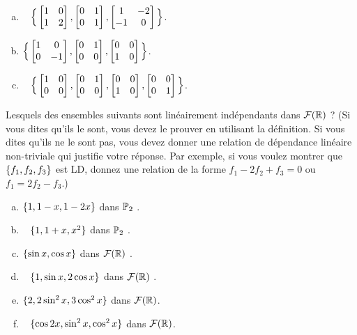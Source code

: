 \begin{prob}
\begin{enumerate}[a)]
\item\sov~ $\Big\{\bmatrix 1&0\\1&2\endbmatrix, \bmatrix 0&1\\0&1\endbmatrix , \bmatrix 1&-2\\-1&0\endbmatrix \Big\}$.   \medskip
 

\item  $\Big\{\bmatrix 1&0\\0&-1\endbmatrix, \bmatrix 0&1\\0&0\endbmatrix,\bmatrix 0&0\\1&0\endbmatrix\Big\}$.  \medskip
 
 \item\sov~ $\Big\{\bmatrix 1&0\\0&0\endbmatrix, \bmatrix 0&1\\0&0\endbmatrix,\bmatrix 0&0\\1&0\endbmatrix,\bmatrix 0&0\\0&1\endbmatrix \Big\}$.  \medskip
 

\end{enumerate}

\end{prob} \begin{prob} \label{prob07.3}  Lesquels des ensembles suivants sont linéairement indépendants dans $\mathcal{F}(\mathbb{R})$ ? (Si vous dites qu'ils le sont, vous devez le prouver en utilisant la définition. Si vous dites qu'ils ne le sont pas, vous devez donner une relation de dépendance linéaire non-triviale qui justifie votre réponse. Par exemple, si vous voulez montrer que $\{f_1, f_2, f_3\}$ est LD, donnez une relation de la forme $f_1-2 f_2 +f_3=0$ ou $f_1=2 f_2 -f_3$.)
\medskip
\begin{enumerate}[a)]
\item  $\{1, 1-x, 1-2x\}$ dans  $\mathbb{P}_2$ . \medskip
 
\item\sov~ $\{1, 1+x, x^2\}$ dans  $\mathbb{P}_2$ . \medskip 
 
\item  $\{ \sin x,  \cos x\}$ dans $\mathcal{F}(\mathbb{R})$ . \medskip  
 
\item\sov~ $\{1, \sin x, 2 \cos x\}$ dans  $\mathcal{F}(\mathbb{R})$ . \medskip  
 
\item  $\{2, 2\sin^2 x,  3\cos^2 x\}$ dans $\mathcal{F}(\mathbb{R})$. \medskip  
 
\item\sov~ $\{\cos 2x, \sin^2 x,  \cos^2 x\}$ dans  $\mathcal{F}(\mathbb{R})$. \medskip  
 

\end{enumerate}
\end{prob}
